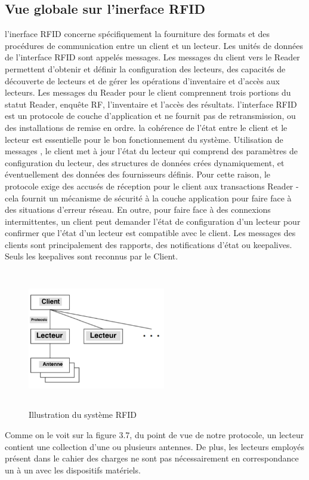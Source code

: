\documentclass[11pt, a4paper, twoside]{book}
\begin{document}
\subsection{Vue globale sur l'inerface RFID}
l'inerface RFID concerne spécifiquement la fourniture des formats et des procédures de communication entre un client et un lecteur. Les unités de données de l'interface RFID sont appelés messages. Les messages du client vers le Reader permettent d'obtenir et définir la configuration des lecteurs, des capacités de découverte de lecteurs et de gérer les opérations d'inventaire et d'accès aux lecteurs. Les messages du Reader pour le client comprennent trois portions du statut Reader, enquête RF, l'inventaire et l'accès des résultats. l'interface RFID est un protocole de couche d'application et ne fournit pas de retransmission, ou des installations de remise en ordre. la cohérence de l'état entre le client et le lecteur est essentielle pour le bon fonctionnement du système. Utilisation de messages , le client met à jour l'état du lecteur qui comprend des paramètres de configuration du lecteur, des structures de données crées dynamiquement, et éventuellement des données des fournisseurs définis. Pour cette raison, le protocole exige des accusés de réception pour le client aux transactions Reader - cela fournit un mécanisme de sécurité à la couche application pour faire face à des situations d'erreur réseau. En outre, pour faire face à des connexions intermittentes, un client peut demander l'état de configuration d'un lecteur pour confirmer que l'état d'un lecteur est compatible avec le client. Les messages des clients sont principalement des rapports, des notifications d'état ou keepalives. Seuls les keepalives sont reconnus par le Client.
\begin{figure}[!h]
\centering
\includegraphics[width=6cm,height=6cm]{lim}
\caption{Illustration du système RFID}
\end{figure}
Comme on le voit sur la figure 3.7, du point de vue de notre protocole, un lecteur contient une collection d'une ou plusieurs antennes. De plus, les lecteurs employés  présent dans le cahier des charges ne sont pas nécessairement en correspondance un à un avec les dispositifs matériels.
\end{document}
